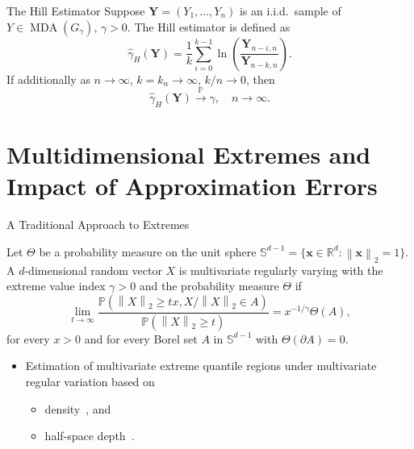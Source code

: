 \documentclass[11pt, aspectratio=169]{beamer}
\DeclareMathOperator{\mda}{MDA}
\begin{document}

\begin{frame}{The Hill Estimator \parencite{hill1975,mason1982}}
  Suppose $\bm Y = \left(Y_1, \ldots, Y_n\right)$ is an i.i.d.\ sample of
  $Y\in\mda\left(G_\gamma\right)$, $\gamma > 0$. The Hill estimator is defined
  as
  \begin{equation*}
    \hat\gamma_H\left(\bm Y\right) = \frac{1}{k}\sum_{i = 0}^{k - 1}
    \ln\left(\frac{\bm Y_{n-i,n}}{\bm Y_{n-k,n}}\right).
  \end{equation*}
  \pause
  If additionally as $n\to\infty$, $k = k_n\to\infty$, $k/n\to 0$, then
  \begin{equation*}
    \hat\gamma_H\left(\bm Y\right)\stackrel{\mathbb{P}}{\to} \gamma,
    \quad n\to\infty.
  \end{equation*}
\end{frame}


\section{Multidimensional Extremes and Impact of Approximation Errors}


\begin{frame}{A Traditional Approach to Extremes}
  \small
  \begin{definition}
    Let $\Theta$ be a probability measure on the unit sphere $\mathbb{S}^{d-1} =
    \{\bm x\in\mathbb{R}^d : \left\|\bm x\right\|_2 = 1\}$. A $d$-dimensional
    random vector $X$ is multivariate regularly varying with the extreme value
    index $\gamma > 0$ and the probability measure $\Theta$ if
    \begin{equation*}
      \lim_{t\to\infty} \frac{\mathbb{P}\left(\left\| X \right\|_2 \geq tx,
      X/\left\|X\right\|_2\in A\right)}
      {\mathbb{P}\left(\left\|X\right\|_2\geq t\right)} = x^{-1/\gamma}
      \Theta\left(A\right),
    \end{equation*}
    for every $x > 0$ and for every Borel set $A$ in $\mathbb{S}^{d-1}$ with
    $\Theta\left(\partial A\right) = 0$.
\end{definition}
\pause
\begin{itemize}
  \item Estimation of multivariate extreme quantile regions under multivariate
  regular variation based on
  \begin{itemize}
    \item density~\parencite{cai2011}, and
    \item half-space depth~\parencite{he2016}.
  \end{itemize}
\end{itemize}
\end{frame}
\end{document}
